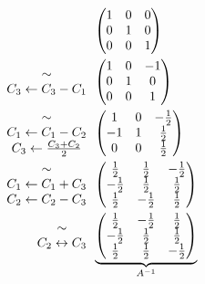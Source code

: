 \begin{exm}
	\begin{align*}
		&\begin{pmatrix}
			1&0&0\\
			0&1&0\\
			0&0&1\\
		\end{pmatrix}\\
		\begin{array}{c}
			\sim\\
			C_3 \leftarrow C_3 - C_1
		\end{array}&
		\begin{pmatrix}
			1&0&-1\\
			0&1&0\\
			0&0&1
		\end{pmatrix}\\
		\begin{array}{c}
			\sim\\
			C_1 \leftarrow C_1 - C_2\\
			C_3 \leftarrow \frac{C_3 + C_2}{2}
		\end{array}&
		\begin{pmatrix}
			1&0&-\frac{1}{2}\\
			-1&1&\frac{1}{2}\\
			0&0&\frac{1}{2}
		\end{pmatrix}\\
		\begin{array}{c}
			\sim\\
			C_1 \leftarrow C_1 + C_3\\
			C_2 \leftarrow C_2 - C_3
		\end{array}&
		\begin{pmatrix}
			\frac{1}{2}&\frac{1}{2}&-\frac{1}{2}\\
			-\frac{1}{2}&\frac{1}{2}&\frac{1}{2}\\
			\frac{1}{2}&-\frac{1}{2}&\frac{1}{2}
		\end{pmatrix}\\
		\begin{array}{c}
			\sim\\
			C_2 \leftrightarrow C_3
		\end{array}&
		\underbrace{
			\begin{pmatrix}
				\frac{1}{2}&-\frac{1}{2}&\frac{1}{2}\\
				-\frac{1}{2}&\frac{1}{2}&\frac{1}{2}\\
				\frac{1}{2}&\frac{1}{2}&-\frac{1}{2}
			\end{pmatrix}
		}_{A^{-1}}
	\end{align*}
\end{exm}

